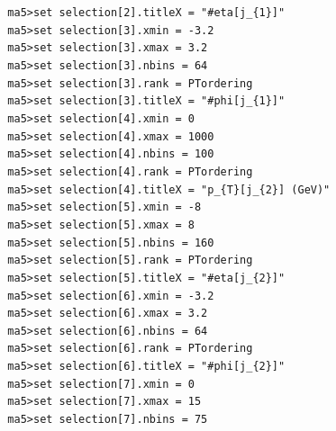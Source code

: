 \documentclass[a4paper, 10pt]{article}
\begin{document}
\texttt{ }\texttt{ }\texttt{ma5>set selection[2].titleX = "\#eta[j\_\{1\}]"\\
}
\texttt{ }\texttt{ }\texttt{ma5>set selection[3].xmin = -3.2\\
}
\texttt{ }\texttt{ }\texttt{ma5>set selection[3].xmax = 3.2\\
}
\texttt{ }\texttt{ }\texttt{ma5>set selection[3].nbins = 64\\
}
\texttt{ }\texttt{ }\texttt{ma5>set selection[3].rank = PTordering\\
}
\texttt{ }\texttt{ }\texttt{ma5>set selection[3].titleX = "\#phi[j\_\{1\}]"\\
}
\texttt{ }\texttt{ }\texttt{ma5>set selection[4].xmin = 0\\
}
\texttt{ }\texttt{ }\texttt{ma5>set selection[4].xmax = 1000\\
}
\texttt{ }\texttt{ }\texttt{ma5>set selection[4].nbins = 100\\
}
\texttt{ }\texttt{ }\texttt{ma5>set selection[4].rank = PTordering\\
}
\texttt{ }\texttt{ }\texttt{ma5>set selection[4].titleX = "p\_\{T\}[j\_\{2\}] (GeV)"\\
}
\texttt{ }\texttt{ }\texttt{ma5>set selection[5].xmin = -8\\
}
\texttt{ }\texttt{ }\texttt{ma5>set selection[5].xmax = 8\\
}
\texttt{ }\texttt{ }\texttt{ma5>set selection[5].nbins = 160\\
}
\texttt{ }\texttt{ }\texttt{ma5>set selection[5].rank = PTordering\\
}
\texttt{ }\texttt{ }\texttt{ma5>set selection[5].titleX = "\#eta[j\_\{2\}]"\\
}
\texttt{ }\texttt{ }\texttt{ma5>set selection[6].xmin = -3.2\\
}
\texttt{ }\texttt{ }\texttt{ma5>set selection[6].xmax = 3.2\\
}
\texttt{ }\texttt{ }\texttt{ma5>set selection[6].nbins = 64\\
}
\texttt{ }\texttt{ }\texttt{ma5>set selection[6].rank = PTordering\\
}
\texttt{ }\texttt{ }\texttt{ma5>set selection[6].titleX = "\#phi[j\_\{2\}]"\\
}
\texttt{ }\texttt{ }\texttt{ma5>set selection[7].xmin = 0\\
}
\texttt{ }\texttt{ }\texttt{ma5>set selection[7].xmax = 15\\
}
\texttt{ }\texttt{ }\texttt{ma5>set selection[7].nbins = 75\\
}
\end{document}
